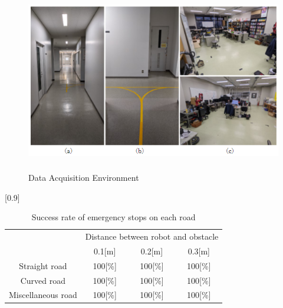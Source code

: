 \begin{figure}[h]
  \begin{center}
  \includegraphics[height=80mm,clip]{figure/2-1_Data-Acquisition-Environment.png}
  \caption{Data Acquisition Environment\cite{深層学習を用いた人追従機能の開発}}
  \label{2-1_Data Acquisition Environment}
  \end{center}
\end{figure}

\begin{table}[h]
  \begin{center}
    \caption{{Success rate of emergency stops on each road\cite{深層学習を用いた人追従機能の開発}}
    \label{2-1_Success rate of emergency stops on each road}}
    \scalebox{1.0}[0.9]{
      \begin{tabular}{c|ccc} \hline
        \multicolumn{1}{c|}{} & \multicolumn{3}{c}{Distance between robot and obstacle} \\
        \cline{2-4}
        \multicolumn{1}{c|}{}
          & 0.1[m] & 0.2[m] & 0.3[m] \\ \hline
          Straight road & 100[\%] & 100[\%] & 100[\%] \\
          Curved road & 100[\%] & 100[\%] & 100[\%] \\
          Miscellaneous road & 100[\%] & 100[\%] & 100[\%] \\ \hline
      \end{tabular}
    }
  \end{center}
\end{table}

\clearpage

